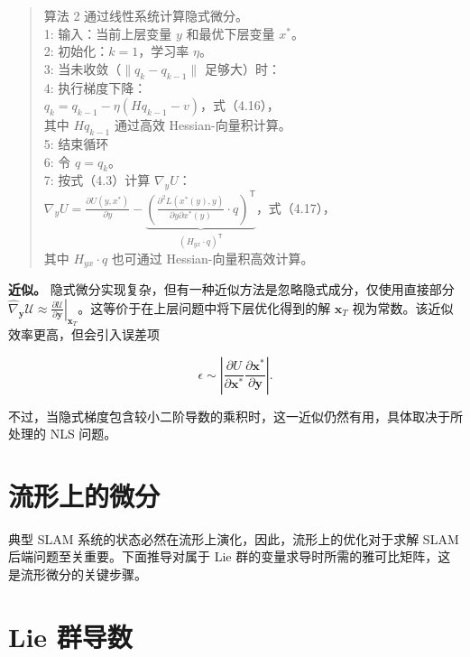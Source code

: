 \begin{quote}
\small
算法 2 通过线性系统计算隐式微分。\\
1: 输入：当前上层变量 $y$ 和最优下层变量 $x^{*}$。\\
2: 初始化：$k = 1$，学习率 $\eta$。\\
3: 当未收敛（$\|q_{k}-q_{k-1}\|$ 足够大）时：\\
4: 执行梯度下降：\\
$q_{k}=q_{k-1}-\eta(Hq_{k-1}-v)$，式（4.16），\\
其中 $Hq_{k-1}$ 通过高效 Hessian-向量积计算。\\
5: 结束循环\\
6: 令 $q=q_{k}$。\\
7: 按式（4.3）计算 $\nabla_{y}U$：\\
$\nabla_{y}U=\frac{\partial U(y,x^{*})}{\partial y}-\underbrace{\left(\frac{\partial^{2}L(x^{*}(y),y)}{\partial y\partial x^{*}(y)}\cdot q\right)^{\mathsf{T}}} _{(H_{yx}\cdot q)^{\mathsf{T}}}$，式（4.17），\\
其中 $H_{yx}\cdot q$ 也可通过 Hessian-向量积高效计算。\\
\end{quote}

\textbf{近似。} 隐式微分实现复杂，但有一种近似方法是忽略隐式成分，仅使用直接部分 $\hat{\nabla}_{\pmb{y}} \mathcal{U} \approx \left.\frac{\partial \mathcal{U}}{\partial \pmb{y}}\right|_{\pmb{x}_T}$。这等价于在上层问题中将下层优化得到的解 $\pmb{x}_T$ 视为常数。该近似效率更高，但会引入误差项

\begin{equation}
\epsilon \sim \left| \frac {\partial U}{\partial \pmb {x} ^ {*}} \frac {\partial \pmb {x} ^ {*}}{\partial \pmb {y}} \right|.\tag{4.18}
\end{equation}

不过，当隐式梯度包含较小二阶导数的乘积时，这一近似仍然有用，具体取决于所处理的 NLS 问题。

\section{流形上的微分}

典型 SLAM 系统的状态必然在流形上演化，因此，流形上的优化对于求解 SLAM 后端问题至关重要。下面推导对属于 Lie 群的变量求导时所需的雅可比矩阵，这是流形微分的关键步骤。

\section{Lie 群导数}

